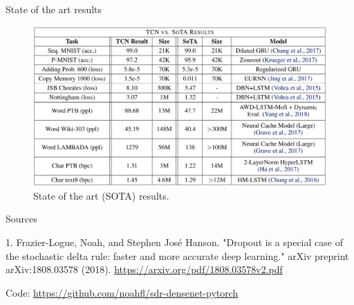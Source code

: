 \documentclass{beamer}
\begin{document}
\begin{frame}{State of the art results}
\begin{figure}[h]
\includegraphics[width=1.0\textwidth]{img/sota}
\caption{State of the art (SOTA) results. }
\end{figure}
\end{frame}


\begin{frame}{Sources}

\begin{thebibliography}{0}

   1. Frazier-Logue, Noah, and Stephen José Hanson. "Dropout is a special case of the stochastic delta rule: faster and more accurate deep learning." arXiv preprint arXiv:1808.03578 (2018). \url{https://arxiv.org/pdf/1808.03578v2.pdf} 
  
  Code: \url{https://github.com/noahfl/sdr-densenet-pytorch}
  
\end{thebibliography}

\end{frame}

 
 
 
\end{document}
